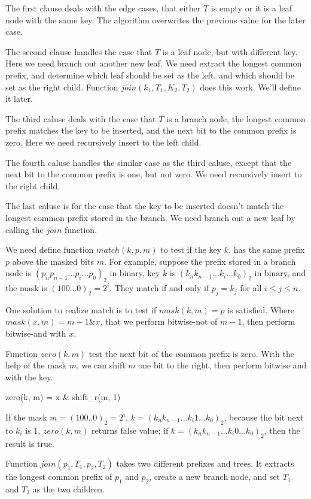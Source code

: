 \documentclass{article}
\begin{document}
The first clause deals with the edge cases, that either $T$ is empty or
it is a leaf node with the same key. The algorithm overwrites the previous
value for the later case.

The second clause handles the case that $T$ is a leaf node, but with different
key. Here we need branch out another new leaf. We need extract the longest
common prefix, and determine which leaf should be set as the left, and
which should be set as the right child. Function $join(k_1, T_1, K_2, T_2)$
does this work. We'll define it later.

The third caluse deals with the case that $T$ is a branch node, the
longest common prefix matches the key to be inserted, and the next
bit to the common prefix is zero. Here we need recursively insert
to the left child.

The fourth caluse handles the similar case as the third caluse, except
that the next bit to the common prefix is one, but not zero. We need
recursively insert to the right child.

The last caluse is for the case that the key to be inserted doesn't
match the longest common prefix stored in the branch. We need branch
out a new leaf by calling the $join$ function.

We need define function $match(k, p, m)$ to test if the key $k$, has
the same prefix $p$ above the masked bits $m$.
For example, suppose the prefix stored in a branch node is
$(p_np_{n-1} ... p_i...p_0)_2$ in binary, key $k$ is
$(k_nk_{n-1} ... k_i ... k_0)_2$ in binary, and the mask is
$(100...0)_2=2^i$. They match if and only if $p_j=k_j$ for all $i \leq j \leq n$.

One solution to realize match is to test if $mask(k, m) = p$ is satisfied.
Where $mask(x, m) = \overline{m-1} \& x$, that we perform bitwise-not of $m-1$, then
perform bitwise-and with $x$.

Function $zero(k, m)$ test the next bit of the common prefix is zero.
With the help of the mask $m$, we can shift $m$ one bit to the right,
then perform bitwise and with the key.

\be
zero(k, m) = x \& shift_r(m, 1)
\ee

If the mask $m = (100..0)_2 = 2^i$, $k = (k_nk_{n-1}...k_i1...k_0)_2$,
because the bit next to $k_i$ is 1, $zero(k, m)$ returns false value;
if $k = (k_nk_{n-1}...k_i0...k_0)_2$, then the result is true.

Function $join(p_1, T_1, p_2, T_2)$ takes two different prefixes and trees.
It extracts the longest common prefix of $p_1$ and $p_2$, create a
new branch node, and set $T_1$ and $T_2$ as the two children.
\end{document}
